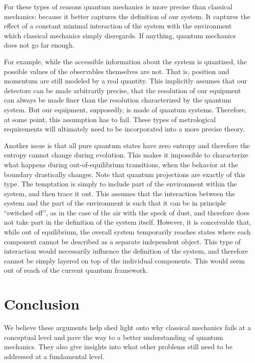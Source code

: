 \documentclass[10pt,twocolumn, nofootinbib]{revtex4-2}
\begin{document}
For these types of reasons quantum mechanics is more precise than classical mechanics: because it better captures the definition of our system. It captures the effect of a constant minimal interaction of the system  with the environment which classical mechanics simply disregards. If anything, quantum mechanics does not go far enough.

For example, while the accessible information about the system is quantized, the possible values of the observables themselves are not. That is, position and momentum are still modeled by a real quantity. This implicitly assumes that our detectors can be made arbitrarily precise, that the resolution of our equipment can always be made finer than the resolution characterized by the quantum system. But our equipment, supposedly, is made of quantum systems. Therefore, at some point, this assumption has to fail. These types of metrological requirements will ultimately need to be incorporated into a more precise theory.

Another issue is that all pure quantum states have zero entropy and therefore the entropy cannot change during evolution. This makes it impossible to characterize what happens during out-of-equilibrium transitions, when the behavior at the boundary drastically changes. Note that quantum projections are exactly of this type. The temptation is simply to include part of the environment within the system, and then trace it out. This assumes that the interaction between the system and the part of the environment is such that it can be in principle ``switched off'', as in the case of the air with the speck of dust, and therefore does not take part in the definition of the system itself. However, it is conceivable that, while out of equilibrium, the overall system temporarily reaches states where each component cannot be described as a separate independent object. This type of interaction would necessarily influence the definition of the system, and therefore cannot be simply layered on top of the individual components. This would seem out of reach of the current quantum framework.

\section{Conclusion}

We believe these arguments help shed light onto why classical mechanics fails at a conceptual level and pave the way to a better understanding of quantum mechanics. They also give insights into what other problems still need to be addressed at a fundamental level.
\end{document}
